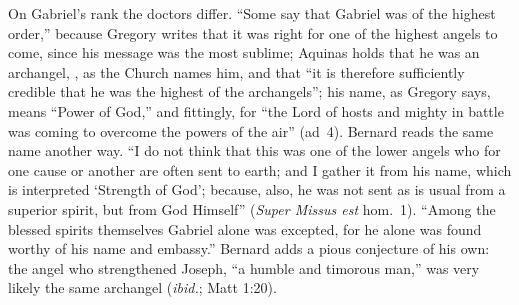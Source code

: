 On Gabriel's rank the doctors differ. ``Some say that Gabriel was of the
highest order,'' because Gregory writes that it was right for one of the
highest angels to come, since his message was the most sublime; Aquinas
holds that he was an archangel, , as the
Church names him, and that ``it is therefore sufficiently credible that he was the
highest of the archangels''; his name, as Gregory says, means ``Power of
God,'' and fittingly, for ``the Lord of hosts and mighty in battle was
coming to overcome the powers of the air'' (ad~4). Bernard reads the same
name another way. ``I do not think that this was one of the lower angels
who for one cause or another are often sent to earth; and I gather it from
his name, which is interpreted `Strength of God'; because, also, he was not
sent as is usual from a superior spirit, but from God Himself'' (\emph{Super
Missus est} hom.~1). ``Among the blessed spirits themselves Gabriel alone
was excepted, for he alone was found worthy of his name and embassy.''
Bernard adds a pious conjecture of his own: the angel who strengthened
Joseph, ``a humble and timorous man,'' was very likely the same archangel
(\emph{ibid.}; Matt 1:20).


